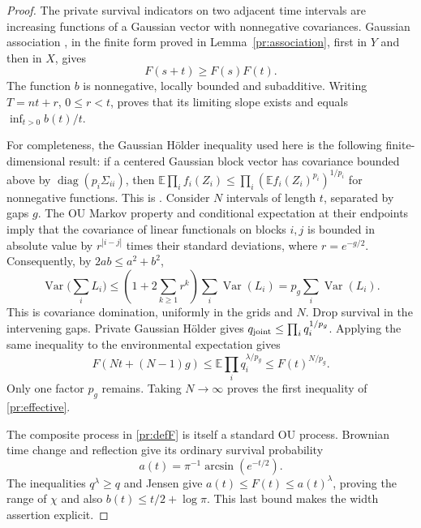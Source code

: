 \begin{proof}
The private survival indicators on two adjacent time intervals are
increasing functions of a Gaussian vector with nonnegative covariances.
Gaussian association \cite{Pitt}, in the finite form proved in
Lemma~\ref{pr:association}, first in $Y$ and then in $X$, gives
\begin{equation}
 F(s+t)\ge F(s)F(t).                                      \label{pr:super}
\end{equation}
The function $b$ is nonnegative, locally bounded and subadditive.
Writing $T=nt+r$, $0\le r<t$, proves that its limiting slope exists
and equals $\inf_{t>0}b(t)/t$.

For completeness, the Gaussian H\"older inequality used here is the
following finite-dimensional result: if a centered Gaussian block vector
has covariance bounded above by $\operatorname{diag}(p_i\Sigma_{ii})$,
then $\mathbb E\prod_i f_i(Z_i)\le\prod_i
(\mathbb E f_i(Z_i)^{p_i})^{1/p_i}$ for nonnegative functions.
This is \cite[Theorem~1(i)]{CDP}.
Consider $N$ intervals of length $t$, separated by gaps $g$. The OU Markov
property and conditional expectation at their endpoints imply that the
covariance of linear functionals on blocks $i,j$ is bounded in absolute
value by $r^{|i-j|}$ times their standard deviations, where $r=e^{-g/2}$.
Consequently, by $2ab\le a^2+b^2$,
\[
 \operatorname{Var}\Big(\sum_i L_i\Big)
 \le \left(1+2\sum_{k\ge1}r^k\right)\sum_i\operatorname{Var}(L_i)
 =p_g\sum_i\operatorname{Var}(L_i).
\]
This is covariance domination, uniformly in the grids and $N$.
Drop survival in the intervening gaps. Private Gaussian H\"older gives
$q_{\rm joint}\le\prod_i q_i^{1/p_g}$. Applying the same inequality to
the environmental expectation gives
\[
 F(Nt+(N-1)g)\le
 \mathbb E\prod_iq_i^{\lambda/p_g}\le F(t)^{N/p_g}.
\]
Only one factor $p_g$ remains. Taking $N\to\infty$ proves the first
inequality of \eqref{pr:effective}.

The composite process in \eqref{pr:defF} is itself a standard OU process.
Brownian time change and reflection give its ordinary survival probability
\begin{equation}
 a(t)=\pi^{-1}\arcsin(e^{-t/2}).                            \label{pr:ordinaryOU}
\end{equation}
The inequalities $q^\lambda\ge q$ and Jensen give
$a(t)\le F(t)\le a(t)^\lambda$, proving the range of $\chi$ and also
$b(t)\le t/2+\log\pi$. This last bound makes the width assertion explicit.


\end{proof}
